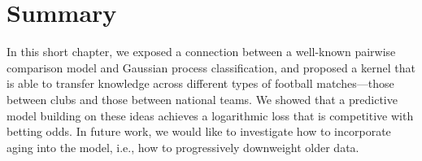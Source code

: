 \section{Summary}
\label{pk:sec:summary}

In this short chapter, we exposed a connection between a well-known pairwise comparison model and Gaussian process classification, and proposed a kernel that is able to transfer knowledge across different types of football matches---those between clubs and those between national teams.
We showed that a predictive model building on these ideas achieves a logarithmic loss that is competitive with betting odds.
In future work, we would like to investigate how to incorporate aging into the model, i.e., how to progressively downweight older data.
